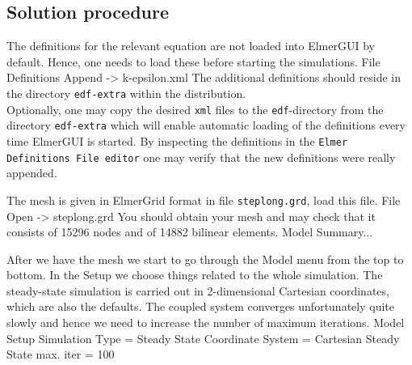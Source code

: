 %


\subsection*{Solution procedure}

The definitions for the relevant equation are not loaded into ElmerGUI by default. Hence, 
one needs to load these before starting the simulations.
\ttbegin
File 
  Definitions
    Append -> k-epsilon.xml
\ttend
The additional definitions should reside in the directory \texttt{edf-extra} within the distribution.\\

Optionally, one may copy the desired \texttt{xml} files to the \texttt{edf}-directory from the 
directory \texttt{edf-extra} which will enable automatic loading of the 
definitions every time ElmerGUI is started. By inspecting the definitions in 
the \texttt{Elmer Definitions File editor} one
may verify that the new definitions were really appended.\newline

The mesh is given in ElmerGrid format in file \texttt{steplong.grd}, load this file.
\ttbegin
File 
  Open -> steplong.grd
\ttend
You should obtain your mesh and may check that it consists of 15296 nodes and of
14882 bilinear elements.
\ttbegin
Model 
  Summary...
\ttend

After we have the mesh we start to go through the Model menu from the top to bottom. 
In the Setup we choose things related to the whole simulation.
The steady-state simulation is carried out in 2-dimensional Cartesian
coordinates, which are also the defaults.  
The coupled system converges unfortunately quite slowly and hence we need to increase the number of maximum iterations. 
\ttbegin
Model
  Setup 
    Simulation Type = Steady State
    Coordinate System = Cartesian
    Steady State max. iter = 100
\ttend

